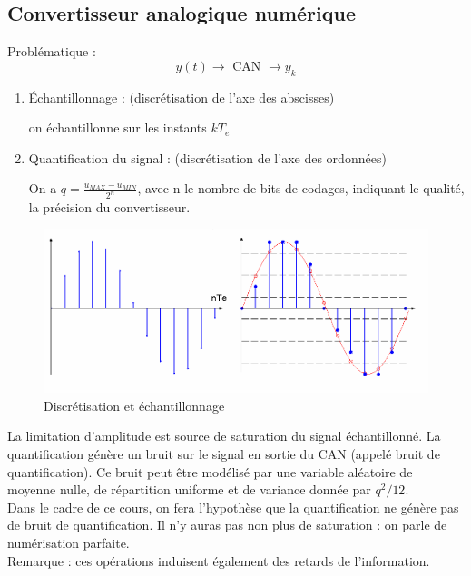 \documentclass[main.tex]{subfiles}
\begin{document}
\subsection{Convertisseur analogique numérique}

Problématique :
\[ y(t) \rightarrow \boxed{\text{ CAN }} \rightarrow y_k \]

\begin{enumerate}
\item Échantillonnage : (discrétisation de l'axe des abscisses)

on échantillonne sur les instants $kT_e$

\item Quantification du signal : (discrétisation de l'axe des ordonnées)

On a $ q = \frac{u_{MAX} - u_{MIN}}{2^n}$, avec n le nombre de bits de codages, indiquant le qualité, la précision du convertisseur.
\end{enumerate}

\begin{figure}[h!]
\centering
\includegraphics[scale=0.6]{CAN.png}
\caption{Discrétisation et échantillonnage}
\end{figure}

La limitation d'amplitude est source de saturation du signal échantillonné. La quantification génère un bruit sur le signal en sortie du CAN (appelé bruit de quantification). Ce bruit peut être modélisé par une variable aléatoire  de moyenne nulle, de répartition uniforme et de variance donnée par $q^2 / 12 $.\\

Dans le cadre de ce cours, on fera l'hypothèse que la quantification ne génère pas de bruit de quantification. Il n'y auras pas non plus de saturation : on parle de numérisation parfaite.\\

Remarque : ces opérations induisent également des retards de l'information. \\
\end{document}
